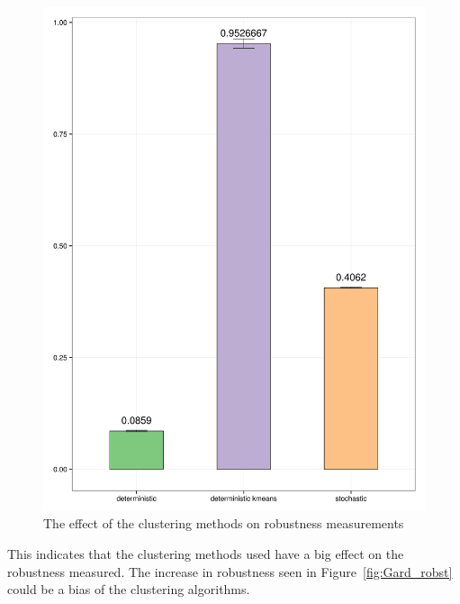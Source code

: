 \begin{figure}[h]
\centering
\includegraphics[scale=0.15]{chapterModelling/images/Gardner/robustness_comparison_gard_stoch_determ_kmeans.png}
\caption{The effect of the clustering methods on robustness measurements}
\label{fig:Gard_det_stoch_kmeans}
\end{figure}

This indicates that the clustering methods used have a big effect on the robustness measured. The increase in robustness seen in Figure~\ref{fig:Gard_robst} could be a bias of the clustering algorithms.
\clearpage
